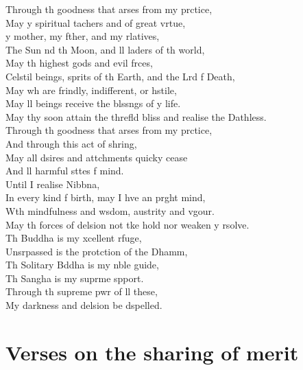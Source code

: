 Through th goodness that arses from my prctice,\\
May y spiritual tachers and  of great vrtue,\\
y mother, my fther, and my rlatives,\\
The Sun nd th Moon, and ll  laders of th world,\\
May th highest gods and evil frces,\\
Celstil beings,  sprits of th Earth, and the Lrd f Death,\\
May  wh are frindly, indifferent, or hstile,\\
May ll beings receive the blssngs of y life.\\
May thy soon attain the threfld bliss and realise the Dathless.\\
Through th goodness that arses from my prctice,\\
And through this act of shring,\\
May all dsires and attchments quicky cease\\
And ll harmful sttes f mind.\\
Until I realise Nibbna,\\
In every kind f birth, may I hve an prght mind,\\
Wth mindfulness and wsdom, austrity and vgour.\\
May th forces of delsion not tke hold nor weaken y rsolve.\\
Th Buddha is my xcellent rfuge,\\
Unsrpassed is the protction of the Dhamm,\\
Th Solitary Bddha is my nble guide,\\
Th Sangha is my suprme spport.\\
Through th supreme pwr of ll these,\\
My darkness and delsion be dspelled.

\clearpage

\chapter[Sharing of Merit]{Verses on the sharing of merit}%

